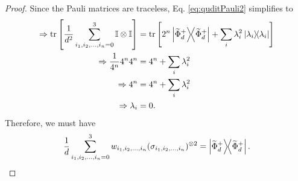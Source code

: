 \documentclass[12pt]{iopart}
\begin{document}
\begin{proof}
    Since the Pauli matrices are traceless, Eq. \eqref{eq:quditPauli2} simplifies to
    \begin{align}
        \notag\Rightarrow\notag\tr\left[\dfrac{1}{d^2}\sum_{i_1,i_2,...,i_{n}=0}^{3}\mathbb{I}\otimes\mathbb{I}
        \right]&=\tr\left[2^{n}\op{\widetilde\Phi_d^+}+\sum_i\lambda_i^2\op{\lambda_i}\right]\\
        \notag\Rightarrow\dfrac{1}{4^{n}}4^{n}4^{n}&=4^{n}+\sum_i\lambda_i^2\\
        \notag\Rightarrow 4^n&=4^n+\sum_i\lambda_i^2\\
        \Rightarrow \lambda_i&=0.
    \end{align}
    Therefore, we must have
    \begin{align}
        \dfrac{1}{d}\sum_{i_1,i_2,...,i_{n}=0}^{3}w_{i_1,i_2,...,i_{n}}(\sigma_{i_1,i_2,...,i_{n}})^{\otimes 2}=\op{\widetilde\Phi_d^+}.
    \end{align}
    

\end{proof}
\end{document}
